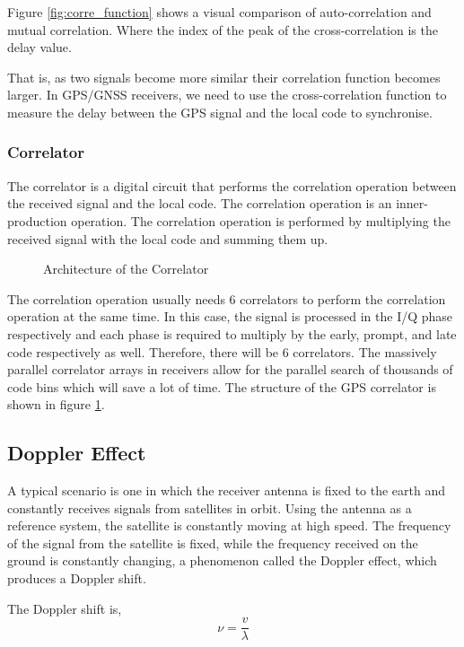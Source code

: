 Figure \ref{fig:corre_function} shows a visual comparison of auto-correlation and mutual correlation. Where the index of the peak of the cross-correlation is the delay value.

That is, as two signals become more similar their correlation function becomes larger. In GPS/GNSS receivers, we need to use the cross-correlation function to measure the delay between the GPS signal and the local code to synchronise.

\subsubsection{Correlator}
The correlator is a digital circuit that performs the correlation operation between the received signal and the local code. The correlation operation is an inner-production operation. The correlation operation is performed by multiplying the received signal with the local code and summing them up.

\begin{figure}[!htbp]
    \centering
    
    \caption{Architecture of the Correlator}
    \label{fig:correlator}
\end{figure}

The correlation operation usually needs 6 correlators to perform the correlation operation at the same time. In this case, the signal is processed in the I/Q phase respectively and each phase is required to multiply by the early, prompt, and late code respectively as well. Therefore, there will be 6 correlators. The massively parallel correlator arrays in receivers allow for the parallel search of thousands of code bins which will save a lot of time\cite{RN178}. The structure of the GPS correlator is shown in figure \ref{fig:correlator}.

\subsection{Doppler Effect}
A typical scenario is one in which the receiver antenna is fixed to the earth and constantly receives signals from satellites in orbit. Using the antenna as a reference system, the satellite is constantly moving at high speed. The frequency of the signal from the satellite is fixed, while the frequency received on the ground is constantly changing, a phenomenon called the Doppler effect, which produces a Doppler shift.

The Doppler shift is,
\begin{equation}
    \nu =\frac{v}{\lambda}
\end{equation}


